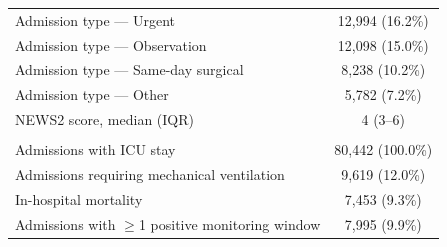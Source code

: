 \begin{table}[H]
\begin{tabular}{lc}
\quad Admission type --- Urgent & 12,994 (16.2\%) \\
\quad Admission type --- Observation & 12,098 (15.0\%) \\
\quad Admission type --- Same-day surgical & 8,238 (10.2\%) \\
\quad Admission type --- Other & 5,782 (7.2\%) \\
\quad NEWS2 score, median (IQR) & 4 (3--6) \\
\addlinespace
\multicolumn{2}{l}{\textit{Outcomes}} \\
\quad Admissions with ICU stay & 80,442 (100.0\%) \\
\quad Admissions requiring mechanical ventilation & 9,619 (12.0\%) \\
\quad In-hospital mortality & 7,453 (9.3\%) \\
\quad Admissions with $\geq$1 positive monitoring window & 7,995 (9.9\%) \\
\bottomrule
\end{tabular}
\end{table}

